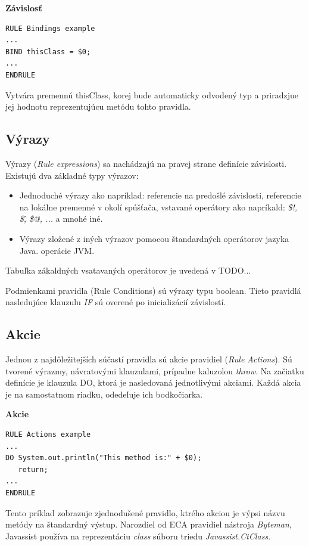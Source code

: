 \documentclass[11pt,final,oneside]{fithesis}
\newenvironment{example}[1]
{
\vspace{3mm}
\noindent\textbf{#1}
\vspace{2mm}
}
{
\vspace{3mm}
}
\begin{document}
\begin{example}{Závislosť}
\begin{verbatim}
RULE Bindings example
...
BIND thisClass = $0;
...
ENDRULE
\end{verbatim}
\end{example}

Vytvára premennú thisClass, korej bude automaticky odvodený typ a priradzjue jej hodnotu reprezentujúcu metódu tohto pravidla.

\subsection{Výrazy}
Výrazy (\textit{Rule expressions}) sa nachádzajú na pravej strane definície závislosti. Existujú dva základné typy výrazov:
\begin{itemize}
\item Jednoduché výrazy ako napríklad: referencie na predošlé závislosti, referencie na lokálne premenné v okolí spúšťača, vstavané operátory ako napríkald: \textit{\$!, \$\^, \$@, ...} a mnohé iné.
\item Výrazy zložené z iných výrazov pomocou štandardných operátorov jazyka Java.
operácie JVM.
\end{itemize}
Tabuľka zákaldných vsatavaných operátorov je uvedená v TODO...

Podmienkami pravidla (Rule Conditions) sú výrazy typu boolean. Tieto pravidlá nasledujúce klauzulu \textit{IF} sú overené po inicializácií závislostí.

\subsection{Akcie}

Jednou z najdôležitejších súčastí pravidla sú akcie pravidiel (\textit{Rule Actions}). Sú tvorené výrazmy, návratovými klauzulami, prípadne kaluzolou
\textit{throw}. Na začiatku definície je klauzula DO, ktorá je nasledovaná jednotlivými akciami. Každá akcia je na samostatnom riadku, odedeľuje ich bodkočiarka.

\begin{example}{Akcie}
\begin{verbatim}
RULE Actions example
...
DO System.out.println("This method is:" + $0);
   return;
...
ENDRULE
\end{verbatim}
\end{example}

Tento príklad zobrazuje zjednodušené pravidlo, ktrého akciou je výpsi názvu metódy na štandardný výstup. Narozdiel od ECA pravidiel nástroja
\textit{Byteman}, Javassist používa na reprezentáciu \textit{class} súboru triedu \textit{Javassist.CtClass}.
\end{document}
